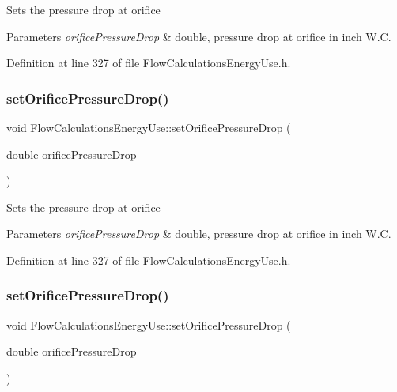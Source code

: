 Sets the pressure drop at orifice


\begin{DoxyParams}{Parameters}
{\em orifice\+Pressure\+Drop} & double, pressure drop at orifice in inch W.\+C. \\
\hline
\end{DoxyParams}


Definition at line 327 of file Flow\+Calculations\+Energy\+Use.\+h.

\mbox{\label{class_flow_calculations_energy_use_ad4b324ecd8288d44c32d622bb26b1bff}} 
\subsubsection{\texorpdfstring{set\+Orifice\+Pressure\+Drop()}{setOrificePressureDrop()}\hspace{0.1cm}{\footnotesize\ttfamily [2/3]}}
{\footnotesize\ttfamily void Flow\+Calculations\+Energy\+Use\+::set\+Orifice\+Pressure\+Drop (\begin{DoxyParamCaption}\item[{double}]{orifice\+Pressure\+Drop }\end{DoxyParamCaption})\hspace{0.3cm}{\ttfamily [inline]}}

Sets the pressure drop at orifice


\begin{DoxyParams}{Parameters}
{\em orifice\+Pressure\+Drop} & double, pressure drop at orifice in inch W.\+C. \\
\hline
\end{DoxyParams}


Definition at line 327 of file Flow\+Calculations\+Energy\+Use.\+h.

\mbox{\label{class_flow_calculations_energy_use_ad4b324ecd8288d44c32d622bb26b1bff}} 
\subsubsection{\texorpdfstring{set\+Orifice\+Pressure\+Drop()}{setOrificePressureDrop()}\hspace{0.1cm}{\footnotesize\ttfamily [3/3]}}
{\footnotesize\ttfamily void Flow\+Calculations\+Energy\+Use\+::set\+Orifice\+Pressure\+Drop (\begin{DoxyParamCaption}\item[{double}]{orifice\+Pressure\+Drop }\end{DoxyParamCaption})\hspace{0.3cm}{\ttfamily [inline]}}

